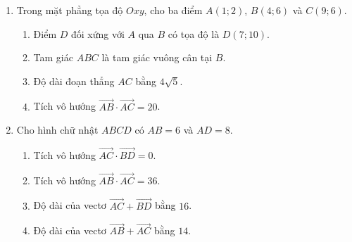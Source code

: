 \documentclass[10pt,a4paper]{article}
\begin{document}
\begin{enumerate}
\item Trong mặt phẳng tọa độ $Oxy$, cho ba điểm $A(1; 2)$, $B(4; 6)$ và $C(9; 6)$.
\begin{enumerate}
    \item Điểm $D$ đối xứng với $A$ qua $B$ có tọa độ là $D(7; 10)$.
    \item Tam giác $ABC$ là tam giác vuông cân tại $B$.
    \item Độ dài đoạn thẳng $AC$ bằng $4\sqrt{5}$.
    \item Tích vô hướng $\vec{AB} \cdot \vec{AC} = 20$.
\end{enumerate}

\item Cho hình chữ nhật $ABCD$ có $AB = 6$ và $AD = 8$.
\begin{enumerate}
    \item Tích vô hướng $\vec{AC} \cdot \vec{BD} = 0$.
    \item Tích vô hướng $\vec{AB} \cdot \vec{AC} = 36$.
    \item Độ dài của vectơ $\vec{AC} + \vec{BD}$ bằng $16$.
    \item Độ dài của vectơ $\vec{AB} + \vec{AC}$ bằng $14$.
\end{enumerate}
\end{enumerate}
\end{document}

